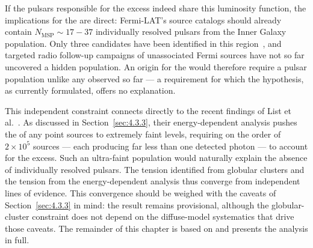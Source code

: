 If the pulsars responsible for the excess indeed share this luminosity function, the implications for the \GCE are direct: Fermi-LAT's source catalogs should already contain $N_\mathrm{MSP} \sim 17{-}37$ individually resolved pulsars from the Inner Galaxy population.
Only three \MSP candidates have been identified in this region~\cite{Holst:2024fvb}, and targeted radio follow-up campaigns of unassociated Fermi sources have not so far uncovered a hidden population.
An \MSP origin for the \GCE would therefore require a pulsar population unlike any observed so far --- a requirement for which the hypothesis, as currently formulated, offers no explanation.

This independent constraint connects directly to the recent findings of List et al.~\cite{List:2025qbx}.
As discussed in Section~\ref{sec:4.3.3}, their energy-dependent \CNN analysis pushes the \SCD of any \GCE point sources to extremely faint levels, requiring on the order of $2 \times 10^5$ sources --- each producing far less than one detected photon --- to account for the excess.
Such an ultra-faint population would naturally explain the absence of individually resolved pulsars.
The tension identified from globular clusters and the tension from the energy-dependent \SCD analysis thus converge from independent lines of evidence.
This convergence should be weighed with the caveats of Section~\ref{sec:4.3.3} in mind: the \SCD result remains provisional, although the globular-cluster constraint does not depend on the diffuse-model systematics that drive those caveats.
The remainder of this chapter is based on \cite{Amerio:2024qor} and presents the analysis in full.





